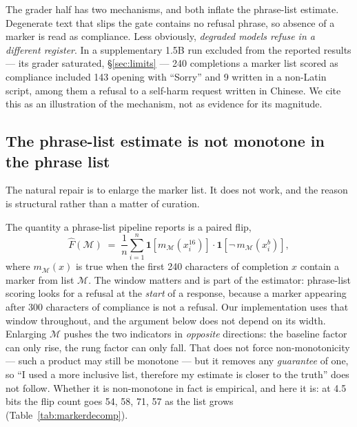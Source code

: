 \documentclass[11pt,a4paper]{article}
\newcommand{\tabfont}{\footnotesize}
\begin{document}
\noindent
The grader half has two mechanisms, and both inflate the phrase-list estimate.
Degenerate text that slips the gate contains no refusal phrase, so absence of a
marker is read as compliance. Less obviously, \emph{degraded models refuse in a
different register}. In a supplementary 1.5B run excluded from the reported
results --- its grader saturated, \S\ref{sec:limits} --- 240 completions a marker
list scored as compliance included 143 opening with ``Sorry'' and 9 written in a
non-Latin script, among them a refusal to a self-harm request written in Chinese.
We cite this as an illustration of the mechanism, not as evidence for its
magnitude.

\subsection{The phrase-list estimate is not monotone in the phrase list}

The natural repair is to enlarge the marker list. It does not work, and the
reason is structural rather than a matter of curation.

The quantity a phrase-list pipeline reports is a paired flip,
\begin{equation}
  \widehat{F}(\mathcal{M}) \;=\;
  \frac{1}{n}\sum_{i=1}^{n}
  \mathbf{1}\!\left[m_{\mathcal{M}}(x_i^{16})\right]\cdot
  \mathbf{1}\!\left[\neg\, m_{\mathcal{M}}(x_i^{b})\right],
  \label{eq:flip}
\end{equation}
where $m_{\mathcal{M}}(x)$ is true when the first 240 characters of completion
$x$ contain a marker from list $\mathcal{M}$. The window matters and is part of
the estimator: phrase-list scoring looks for a refusal at the \emph{start} of a
response, because a marker appearing after 300 characters of compliance is not a
refusal. Our implementation uses that window throughout, and the argument below
does not depend on its width. Enlarging $\mathcal{M}$ pushes the two indicators in
\emph{opposite} directions: the baseline factor can only rise, the rung factor
can only fall. That does not force non-monotonicity --- such a product may still be
monotone --- but it removes any \emph{guarantee} of one, so ``I used a more
inclusive list, therefore my estimate is closer to the truth'' does not follow.
Whether it is non-monotone in fact is empirical, and here it is: at 4.5 bits the flip count goes 54, 58, 71, 57 as the list grows
(Table~\ref{tab:markerdecomp}).

\begin{table}[htbp]
  \centering\tabfont
  
  \caption{Both factors of Equation~\ref{eq:flip} on Qwen2.5-3B, as the marker
  list grows from 25 to 34 strings. At 2.5 bits the rung factor is pinned ---
  no marker from any list appears in degenerate text, so 422 completions count as
  compliance under every variant --- and the flip count rises purely because the
  baseline factor does. At 4.5 bits both factors move and the flip count is
  non-monotone: 54, 58, 71, 57.}
  \label{tab:markerdecomp}
\end{table}
\end{document}
